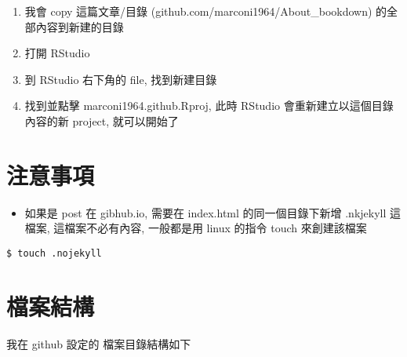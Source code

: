 \documentclass[
]{book}
\providecommand{\tightlist}{%
  \setlength{\itemsep}{0pt}\setlength{\parskip}{0pt}}
\begin{document}
\begin{enumerate}
\def\labelenumi{\arabic{enumi}.}
\tightlist
\item
  我會 copy 這篇文章/目錄 (github.com/marconi1964/About\_bookdown) 的全部內容到新建的目錄
\item
  打開 RStudio
\item
  到 RStudio 右下角的 file, 找到新建目錄
\item
  找到並點擊 marconi1964.github.Rproj, 此時 RStudio 會重新建立以這個目錄內容的新 project, 就可以開始了
\end{enumerate}

\hypertarget{ux6ce8ux610fux4e8bux9805}{%
\section{注意事項}\label{ux6ce8ux610fux4e8bux9805}}

\begin{itemize}
\tightlist
\item
  如果是 post 在 gibhub.io, 需要在 index.html 的同一個目錄下新增 .nkjekyll 這檔案, 這檔案不必有內容, 一般都是用 linux 的指令 touch 來創建該檔案
\end{itemize}

\begin{verbatim}
$ touch .nojekyll
\end{verbatim}

\hypertarget{chap-bookdown-outputdir}{%
\section{檔案結構}\label{chap-bookdown-outputdir}}

我在 github 設定的 檔案目錄結構如下
\end{document}
